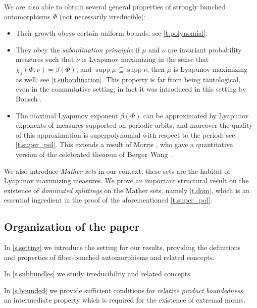 \documentclass[10pt]{amsart}
\theoremstyle{plain}
\theoremstyle{definition}
\DeclareMathOperator{\supp}{supp}
\begin{document}
We are also able to obtain several general properties of strongly bunched automorphisms $\Phi$ (not necessarily irreducible):
\begin{itemize}

\item Their growth obeys certain uniform bounds: see \cref{t.polynomial}.

\item They obey the \emph{subordination principle}: if $\mu$ and $\nu$ are invariant probability measures such that $\nu$ is Lyapunov maximizing in the sense that $\chi_1(\Phi,\nu) = \beta(\Phi)$, and $\supp \mu \subseteq \supp \nu$, then $\mu$ is Lyapunov maximizing as well: see \cref{t.subordination}.
This property is far from being tautological, even in the commutative setting; in fact it was introduced in this setting by Bousch \cite{Bousch_Walters}.

\item The maximal Lyapunov exponent $\beta(\Phi)$ can be approximated by Lyapunov expo\-nents of measures supported on periodic orbits, and moreover the quality of this approximation is superpolynomial with respect to the period: see \cref{t.super_pol}.
This extends a result of Morris \cite{Morris_rapidly}, who gave a quantitative version of the celebrated theorem of Berger--Wang \cite{BWang}.

\end{itemize}

We also introduce \emph{Mather sets} in our context; these sets are the habitat of Lyapunov maximizing measures. We prove an important structural result on the existence of \emph{dominated splittings} on the Mather sets, namely \cref{t.dom}, which is an essential ingredient in the proof of the aforementioned \cref{t.super_pol}.

\subsection{Organization of the paper}

In \cref{s.setting} we introduce the setting for our results, providing the definitions and properties of fiber-bunched automorphisms and related concepts.

In \cref{s.subbundles} we study irreducibility and related concepts.

In \cref{s.bounded} we provide sufficient conditions for \emph{relative product boundedness}, an intermediate property which is required for the existence of extremal norms.
\end{document}
